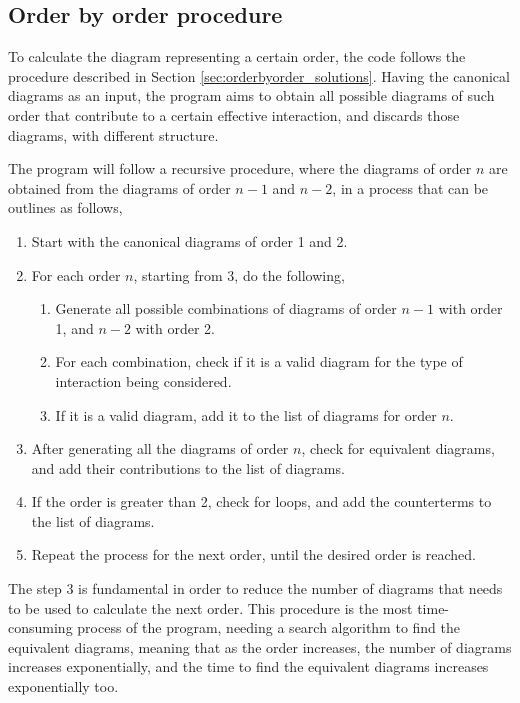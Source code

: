 \documentclass[11pt,a4paper,twoside,pdf]{article}
\numberwithin{equation}{section}
\begin{document}
\subsection{Order by order procedure}

To calculate the diagram representing a certain order, the code follows the 
procedure described in Section \ref{sec:orderbyorder_solutions}. Having the
canonical diagrams as an input, the program aims to obtain all possible diagrams of such order
that contribute to a certain effective interaction, and discards those diagrams, with
different structure.

The program will follow a recursive procedure, where the diagrams of order $n$ are
obtained from the diagrams of order $n-1$ and $n-2$, in a process that can be outlines
as follows,

\begin{enumerate}
    \item Start with the canonical diagrams of order 1 and 2.
    \item For each order $n$, starting from 3, do the following,
    \begin{enumerate}
        \item Generate all possible combinations of diagrams of order $n-1$ with
        order 1, and $n-2$ with order 2.
        \item For each combination, check if it is a valid diagram for the type of interaction
        being considered.
        \item If it is a valid diagram, add it to the list of diagrams for order $n$.
    \end{enumerate}
    \item After generating all the diagrams of order $n$, check for equivalent diagrams,
    and add their contributions to the list of diagrams.
    \item If the order is greater than 2, check for loops, and add the counterterms 
    to the list of diagrams.
    \item Repeat the process for the next order, until the desired order is reached.
\end{enumerate}

The step 3 is fundamental in order to reduce the number of diagrams that needs to 
be used to calculate the next order. This procedure is the most time-consuming process 
of the program, needing a search algorithm to find the equivalent diagrams, meaning 
that as the order increases, the number of diagrams increases exponentially, and the 
time to find the equivalent diagrams increases exponentially too. 
\end{document}
